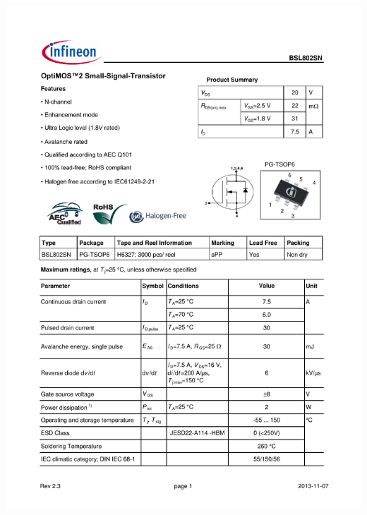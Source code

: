 \documentclass{../template/tp}
\begin{document}
\begin{center}
{\hspace{-1.5cm}\includegraphics[width=17cm,page=5]{Infineon-BSL802SN-DS-v01_00-en.pdf}}
\end{center}
\vspace{-4cm}
\end{document}
